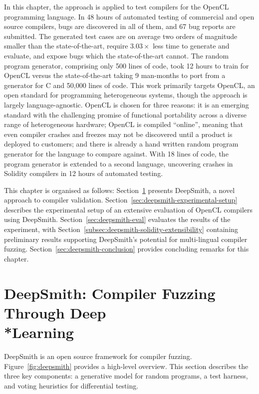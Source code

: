In this chapter, the approach is applied to test compilers for the OpenCL programming language. In 48 hours of automated testing of commercial and open source compilers, bugs are discovered in all of them, and 67 bug reports are submitted. The generated test cases are on average two orders of magnitude smaller than the state-of-the-art, require $3.03\times$ less time to generate and evaluate, and expose bugs which the state-of-the-art cannot. The random program generator, comprising only 500 lines of code, took 12 hours to train for OpenCL versus the state-of-the-art taking 9 man-months to port from a generator for C and 50,000 lines of code.  This work primarily targets OpenCL, an open standard for programming heterogeneous systems, though the approach is largely language-agnostic. OpenCL is chosen for three reasons: it is an emerging standard with the challenging promise of functional portability across a diverse range of heterogeneous hardware; OpenCL is compiled ``online'', meaning that even compiler crashes and freezes may not be discovered until a product is deployed to customers; and there is already a hand written random program generator for the language to compare against. With 18 lines of code, the program generator is extended to a second language, uncovering crashes in Solidity compilers in 12 hours of automated testing.

This chapter is organised as follows:  Section~\ref{sec:deepsmith} presents DeepSmith, a novel approach to compiler validation. Section~\ref{sec:deepsmith-experimental-setup} describes the experimental setup of an extensive evaluation of OpenCL compilers using DeepSmith. Section~\ref{sec:deepsmith-eval} evaluates the results of the experiment, with Section~\ref{subsec:deepsmith-solidity-extensibility} containing preliminary results supporting DeepSmith's potential for multi-lingual compiler fuzzing. Section~\ref{sec:deepsmith-conclusion} provides concluding remarks for this chapter.


\section[DeepSmith: Compiler Fuzzing Through Deep Learning]{DeepSmith: Compiler Fuzzing Through Deep\\*Learning}
\label{sec:deepsmith}

DeepSmith is an open source framework for compiler fuzzing. Figure~\ref{fig:deepsmith} provides a high-level overview. This section describes the three key components: a generative model for random programs, a test harness, and voting heuristics for differential testing.

